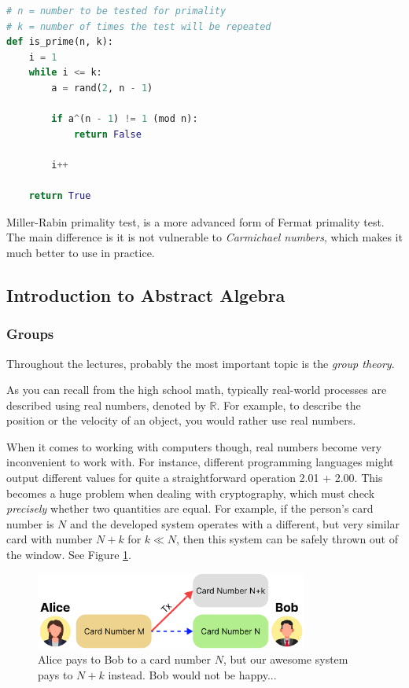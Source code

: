 \documentclass[../lecture-notes.tex]{subfiles}
\begin{document}
\begin{lstlisting}[language=Python]
# n = number to be tested for primality
# k = number of times the test will be repeated
def is_prime(n, k):
    i = 1
    while i <= k:
        a = rand(2, n - 1)

        if a^(n - 1) != 1 (mod n):
            return False

        i++

    return True
\end{lstlisting}

Miller-Rabin primality test, is a more advanced form of Fermat primality test. The main difference is it is not vulnerable to \textit{Carmichael numbers},
which makes it much better to use in practice.

\subsection{Introduction to Abstract Algebra}

\subsubsection{Groups}

Throughout the lectures, probably the most important topic is the \textit{group theory}. 

As you can recall from the high school math, typically real-world processes are described using real numbers, denoted by $\mathbb{R}$. For example, to describe the position or the velocity of an object, you would rather use real numbers. 

When it comes to working with computers though, real numbers become very inconvenient to work with. For instance, different programming languages might output different values for quite a straightforward operation \textsf{2.01 + 2.00}. This becomes a huge problem when dealing with cryptography, which must check \textit{precisely} whether two quantities are equal. 
For example, if the person's card number is $N$ and the developed system operates with a different, but very similar card with number $N + k$ for $k \ll N$, then this system can be safely thrown out of the window. See Figure \ref{fig:why_integers}.

\begin{figure}[H]
    \centering
    \includegraphics[width=0.8\textwidth]{images/lecture_1/why_integers.pdf}
    \caption{Alice pays to Bob to a card number $N$, but our awesome system pays to $N+k$ instead. Bob would not be happy...}
    \label{fig:why_integers}
\end{figure}
\end{document}
